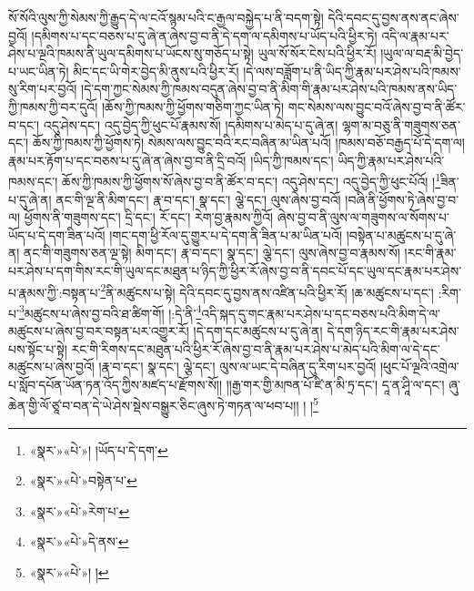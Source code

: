 སོ་སོའི་ལུས་ཀྱི་སེམས་ཀྱི་རྒྱུད་དེ་ལ་ངའོ་སྙམ་པའི་ང་རྒྱལ་བསྐྱེད་པ་ནི་བདག་སྟེ། དེའི་དབང་དུ་བྱས་ནས་ནང་ཞེས་བྱའོ། །དམིགས་པ་དང་བཅས་པ་དུ་ཞེ་ན་ཞེས་བྱ་བ་ནི་དེ་དག་ལ་དམིགས་པ་ཡོད་པའི་ཕྱིར་ཏེ། འདི་ལ་རྣམ་པར་ཤེས་པ་ལྔའི་ཁམས་ནི་ཡུལ་དམིགས་པ་ཡོངས་སུ་གཅོད་པ་སྟེ། ཡུལ་སོ་སོར་ངེས་པའི་ཕྱིར་རོ། །ཡུལ་ལ་བརྡ་མི་བྱེད་པ་ཡང་ཡིན་ཏེ། མིང་དང་ཡི་གེར་བྱེད་མི་ནུས་པའི་ཕྱིར་རོ། །དེ་ལས་བཟློག་པ་ནི་ཡིད་ཀྱི་རྣམ་པར་ཤེས་པའི་ཁམས་སུ་རིག་པར་བྱའོ། །དེ་དག་ཀྱང་སེམས་ཀྱི་ཁམས་བདུན་ཞེས་བྱ་བ་ནི་མིག་གི་རྣམ་པར་ཤེས་པའི་ཁམས་ནས་ཡིད་ཀྱི་ཁམས་ཀྱི་བར་དུའོ། །ཆོས་ཀྱི་ཁམས་ཀྱི་ཕྱོགས་གཅིག་ཀྱང་ཡིན་ཏེ། གང་སེམས་ལས་བྱུང་བའོ་ཞེས་བྱ་བ་ནི་ཚོར་བ་དང་། འདུ་ཤེས་དང་། འདུ་བྱེད་ཀྱི་ཕུང་པོ་རྣམས་སོ། །དམིགས་པ་མེད་པ་དུ་ཞེ་ན། ལྷག་མ་བཅུ་ནི་གཟུགས་ཅན་དང་། ཆོས་ཀྱི་ཁམས་ཀྱི་ཕྱོགས་ཏེ། སེམས་ལས་བྱུང་བའི་རང་བཞིན་མ་ཡིན་པའོ། །ཁམས་བཅོ་བརྒྱད་པོ་དེ་དག་ལ། རྣམ་པར་རྟོག་པ་དང་བཅས་པ་དུ་ཞེ་ན་ཞེས་བྱ་བ་ནི་དྲི་བའོ། །ཡིད་ཀྱི་ཁམས་དང་། ཡིད་ཀྱི་རྣམ་པར་ཤེས་པའི་ཁམས་དང་། ཆོས་ཀྱི་ཁམས་ཀྱི་ཕྱོགས་སོ་ཞེས་བྱ་བ་ནི་ཚོར་བ་དང་། འདུ་ཤེས་དང་། འདུ་བྱེད་ཀྱི་ཕུང་པོའོ། །\footnote{«སྣར་»«པེ་»། །ཡོད་པ་དེ་དག་}ཟིན་པ་དུ་ཞེ་ན། ནང་གི་ལྔ་ནི་མིག་དང་། རྣ་བ་དང་། སྣ་དང་། ལྕེ་དང་། ལུས་ཞེས་བྱ་བའོ། །བཞི་ནི་ཕྱོགས་ཏེ་ཞེས་བྱ་བ་ལ། ཕྱོགས་ནི་གཟུགས་དང་། དྲི་དང་། རོ་དང་། རེག་བྱ་རྣམས་ཀྱིའོ། ཞེས་བྱ་བ་ནི་ལུས་ལ་གཟུགས་ལ་སོགས་པ་ཡོད་པ་དེ་དག་ཟིན་པའོ། །གང་དག་ཕྱི་རོལ་དུ་གྱུར་པ་དེ་དག་ནི་ཟིན་པ་མ་ཡིན་པའོ། །བསྟེན་པ་མཚུངས་པ་དུ་ཞེ་ན། ནང་གི་གཟུགས་ཅན་ལྔ་སྟེ། མིག་དང་། རྣ་བ་དང་། སྣ་དང་། ལྕེ་དང་། ལུས་ཞེས་བྱ་བ་རྣམས་སོ། །རང་གི་རྣམ་པར་ཤེས་པ་དག་གིས་རང་གི་ཡུལ་དང་མཐུན་པ་ཉིད་ཀྱི་ཕྱིར་རོ་ཞེས་བྱ་བ་ནི་དབང་པོ་དང་ཡུལ་དང་རྣམ་པར་ཤེས་པ་རྣམས་ཀྱི་:བསྟན་པ་\footnote{«སྣར་»«པེ་»བསྟེན་པ་}ནི་མཚུངས་པ་སྟེ། དེའི་དབང་དུ་བྱས་ནས་འཛིན་པའི་ཕྱིར་རོ། །ཆ་མཚུངས་པ་དང་། :རིག་པ་\footnote{«སྣར་»«པེ་»རེག་པ་}མཚུངས་པ་ཞེས་བྱ་བའི་ཐ་ཚིག་གོ། །:དེ་ནི་\footnote{«སྣར་»«པེ་»དེ་ནས་}འདི་སྐད་དུ་གང་རྣམ་པར་ཤེས་པ་དང་བཅས་པའི་མིག་དེ་ལ་མཚུངས་པ་ཞེས་བྱ་བར་བསྟན་པར་འགྱུར་རོ། །དེ་དག་དང་མཚུངས་པ་དུ་ཞེ་ན། དེ་དག་ཉིད་རང་གི་རྣམ་པར་ཤེས་པས་སྟོང་པ་སྟེ། རང་གི་རིགས་དང་མཐུན་པའི་ཕྱིར་རོ་ཞེས་བྱ་བ་ནི་རྣམ་པར་ཤེས་པ་མེད་པའི་མིག་ལ་དེ་དང་མཚུངས་པ་ཞེས་བྱའོ། །རྣ་བ་དང་། སྣ་དང་། ལྕེ་དང་། ལུས་ལ་ཡང་དེ་བཞིན་དུ་རིག་པར་བྱའོ། །ཕུང་པོ་ལྔའི་འགྲེལ་པ་སློབ་དཔོན་ཡོན་ཏན་འོད་ཀྱིས་མཛད་པ་རྫོགས་སོ།། །།རྒྱ་གར་གྱི་མཁན་པོ་ཛི་ན་མི་ཏྲ་དང་། དཱ་ན་ཤཱི་ལ་དང་། ཞུ་ཆེན་གྱི་ལོ་ཙཱ་བ་བན་དེ་ཡེ་ཤེས་སྡེས་བསྒྱུར་ཅིང་ཞུས་ཏེ་གཏན་ལ་ཕབ་པ།། །
།\footnote{«སྣར་»«པེ་»། །}